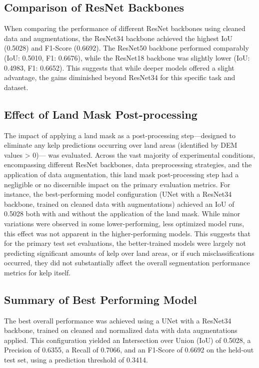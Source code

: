 \documentclass{article}
\begin{document}
\subsection{Comparison of ResNet Backbones} %

When comparing the performance of different ResNet backbones using cleaned data and augmentations, the ResNet34 backbone achieved the highest IoU (0.5028) and F1-Score (0.6692). The ResNet50 backbone performed comparably (IoU: 0.5010, F1: 0.6676), while the ResNet18 backbone was slightly lower (IoU: 0.4983, F1: 0.6652). This suggests that while deeper models offered a slight advantage, the gains diminished beyond ResNet34 for this specific task and dataset.

\subsection{Effect of Land Mask Post-processing} %

The impact of applying a land mask as a post-processing step—designed to eliminate any kelp predictions occurring over land areas (identified by DEM values > 0)— was evaluated. Across the vast majority of experimental conditions, encompassing different ResNet backbones, data preprocessing strategies, and the application of data augmentation, this land mask post-processing step had a negligible or no discernible impact on the primary evaluation metrics. For instance, the best-performing model configuration (UNet with a ResNet34 backbone, trained on cleaned data with augmentations) achieved an IoU of 0.5028 both with and without the application of the land mask. While minor variations were observed in some lower-performing, less optimized model runs, this effect was not apparent in the higher-performing models. This suggests that for the primary test set evaluations, the better-trained models were largely not predicting significant amounts of kelp over land areas, or if such misclassifications occurred, they did not substantially affect the overall segmentation performance metrics for kelp itself.

\subsection{Summary of Best Performing Model} %

The best overall performance was achieved using a UNet with a ResNet34 backbone, trained on cleaned and normalized data with data augmentations applied. This configuration yielded an Intersection over Union (IoU) of 0.5028, a Precision of 0.6355, a Recall of 0.7066, and an F1-Score of 0.6692 on the held-out test set, using a prediction threshold of 0.3414.
\end{document}

